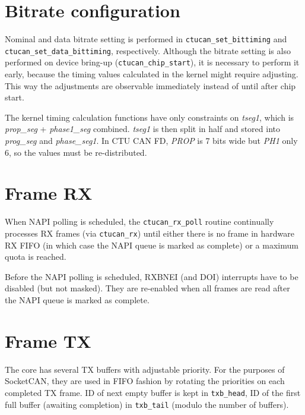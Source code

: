 \section{Bitrate configuration}

Nominal and data bitrate setting is performed in \verb|ctucan_set_bittiming|
and \verb|ctucan_set_data_bittiming|, respectively. Although the bitrate setting
is also performed on device bring-up (\verb|ctucan_chip_start|), it is necessary
to perform it early, because the timing values calculated in the kernel might
require adjusting. This way the adjustments are observable immediately instead
of until after chip start.

The kernel timing calculation functions have only constraints on \textit{tseg1},
which is \textit{prop\_seg} + \textit{phase1\_seg} combined. \textit{tseg1} is
then split in half and stored into \textit{prog\_seg} and \textit{phase\_seg1}.
In CTU CAN FD, \textit{PROP} is 7 bits wide but \textit{PH1} only 6, so the
values must be re-distributed.

\section{Frame RX}


When NAPI polling is scheduled, the \verb|ctucan_rx_poll| routine continually
processes RX frames (via \verb|ctucan_rx|) until either there is no frame
in hardware RX FIFO (in which case the NAPI queue is marked as complete) or a
maximum quota is reached.

Before the NAPI polling is scheduled, RXBNEI (and DOI) interrupts have to be
disabled (but not masked). They are re-enabled when all frames are read after
the NAPI queue is marked as complete.

\section{Frame TX}


The core has several TX buffers with adjustable priority. For the purposes of
SocketCAN, they are used in FIFO fashion by rotating the priorities on each
completed TX frame. ID of next empty buffer is kept in \verb|txb_head|,
ID of the first full buffer (awaiting completion) in \verb|txb_tail| (modulo the
number of buffers).

